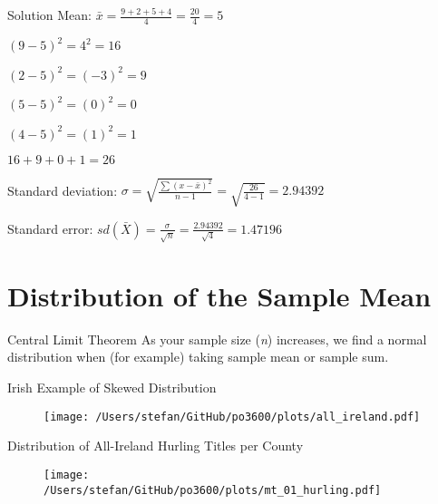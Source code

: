 \documentclass[10pt]{beamer}
\begin{document}
\begin{frame}{Solution}
Mean: $\bar{x}=\frac{9 + 2 + 5 + 4}{4} = \frac{20}{4}=5$

\pause

$(9 - 5)^{2} = 4^{2} = 16$

$(2 - 5)^{2} = (-3)^{2} = 9$

$(5 - 5)^{2} = (0)^{2} = 0$

$(4 - 5)^{2} = (1)^{2} = 1$

\pause

$16 + 9 +  0 + 1 = 26$

\pause 

Standard deviation: $\sigma=\sqrt{\frac{\sum(x-\bar{x})^{2}}{n-1}} = \sqrt{\frac{26}{4-1}}= 2.94392$

\pause
Standard error:  $sd(\bar{X})=\frac{\sigma}{\sqrt{n}}=\frac{2.94392}{\sqrt{4}}=1.47196$

\end{frame}

\section{Distribution of the Sample Mean}


\begin{frame}{Central Limit Theorem}
As your sample size (\textit{n}) increases, we find a normal distribution when (for example) taking sample mean or sample sum.

\end{frame}

\begin{frame}{Irish Example of Skewed Distribution}
\pause
\begin{figure} \centering
\texttt{[image: /Users/stefan/GitHub/po3600/plots/all\_ireland.pdf]}
\end{figure}
\end{frame}

\begin{frame}{Distribution of All-Ireland Hurling Titles per County}

\begin{figure} \centering
\texttt{[image: /Users/stefan/GitHub/po3600/plots/mt\_01\_hurling.pdf]}
\end{figure}
\end{frame}
\end{document}
